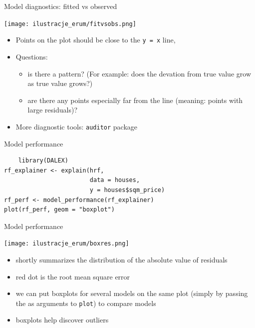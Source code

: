 \documentclass[xcolor={dvipsnames}]{beamer}
\begin{document}
\begin{frame}[fragile]{Model diagnostics: fitted vs observed}

\begin{multicols}{2}
	\texttt{[image: ilustracje\_erum/fitvsobs.png]}

	\columnbreak
	\begin{itemize}
	\item Points on the plot should be close to the \texttt{y = x} line,
	
	\item Questions:
	
	\begin{itemize}
		
		\item is there a pattern? (For example: does the devation from true value grow as true value grows?)
		
		\item are there any points especially far from the line (meaning: points with large residuals)?
		
	\end{itemize}
	
	\item More diagnostic tools: \texttt{auditor} package
\end{itemize}
\end{multicols}
\end{frame}


\begin{frame}[fragile]{Model performance}
	\begin{lstlisting}
	library(DALEX)
rf_explainer <- explain(hrf, 
	                    data = houses, 
	                    y = houses$sqm_price)
rf_perf <- model_performance(rf_explainer)
plot(rf_perf, geom = "boxplot")
	\end{lstlisting}
\end{frame}

\begin{frame}{Model performance}
\begin{multicols}{2}
	\texttt{[image: ilustracje\_erum/boxres.png]}
\columnbreak
	\begin{itemize}
	\item shortly summarizes the distribution of the absolute value of residuals
	\item red dot is the root mean square error
	\item we can put boxplots for several models on the same plot (simply by passing the as arguments to \texttt{plot}) to compare models
	\item boxplots help discover outliers
\end{itemize}
\end{multicols}

\end{frame}
\end{document}
